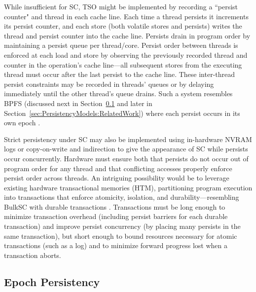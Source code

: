 While insufficient for SC, TSO might be implemented by recording a ``persist counter" and thread in each cache line.
Each time a thread persists it increments its persist counter, and each store (both volatile stores and persists) writes the thread and persist counter into the cache line.
Persists drain in program order by maintaining a persist queue per thread/core.
Persist order between threads is enforced at each load and store by observing the previously recorded thread and counter in the operation's cache line---all subsequent stores from the executing thread must occur after the last persist to the cache line.
These inter-thread persist constraints may be recorded in threads' queues or by delaying immediately until the other thread's queue drains.
Such a system resembles BPFS (discussed next in Section~\ref{section:PersistencyModels:PersistEpochs} and later in Section~\ref{sec:PersistencyModels:RelatedWork}) where each persist occurs in its own epoch \cite{ConditNightingale09}.

Strict persistency under SC may also be implemented using in-hardware NVRAM logs or copy-on-write and indirection to give the appearance of SC while persists occur concurrently.
Hardware must ensure both that persists do not occur out of program order for any thread and that conflicting accesses properly enforce persist order across threads.
An intriguing possibility would be to leverage existing hardware transactional memories (HTM), partitioning program execution into transactions that enforce atomicity, isolation, and durability---resembling BulkSC with durable transactions \cite{CezeTuck07}.
Transactions must be long enough to minimize transaction overhead (including persist barriers for each durable transaction) and improve persist concurrency (by placing many persists in the same transaction), but short enough to bound resources necessary for atomic transactions (such as a log) and to minimize forward progress lost when a transaction aborts.

\subsection{Epoch Persistency}
\label{section:PersistencyModels:PersistEpochs}

